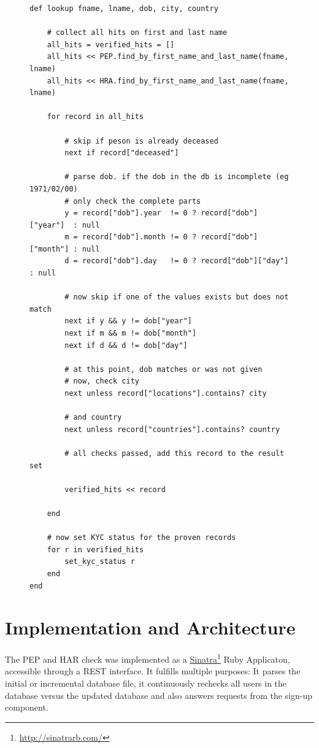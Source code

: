 \documentclass[a4paper, oneside]{csthesis}
\newcommand\fnurl[2]{%
  \href{#2}{#1}\footnote{\url{#2}}%
}
\begin{document}
\begin{figure}
\begin{lstlisting}[caption={The PEP/HRA Lookup algorithm},label={lst:world-check-lookup}]
def lookup fname, lname, dob, city, country

    # collect all hits on first and last name
    all_hits = verified_hits = []
    all_hits << PEP.find_by_first_name_and_last_name(fname, lname)
    all_hits << HRA.find_by_first_name_and_last_name(fname, lname)

    for record in all_hits

        # skip if peson is already deceased
        next if record["deceased"]

        # parse dob. if the dob in the db is incomplete (eg 1971/02/00)
        # only check the complete parts
        y = record["dob"].year  != 0 ? record["dob"]["year"]  : null
        m = record["dob"].month != 0 ? record["dob"]["month"] : null
        d = record["dob"].day   != 0 ? record["dob"]["day"]   : null

        # now skip if one of the values exists but does not match
        next if y && y != dob["year"]
        next if m && m != dob["month"]
        next if d && d != dob["day"]

        # at this point, dob matches or was not given
        # now, check city
        next unless record["locations"].contains? city

        # and country
        next unless record["countries"].contains? country

        # all checks passed, add this record to the result set

        verified_hits << record

    end

    # now set KYC status for the proven records
    for r in verified_hits
        set_kyc_status r
    end
end
\end{lstlisting}
\end{figure}

\section{Implementation and Architecture}

The PEP and HAR check was implemented as a \fnurl{Sinatra}{http://sinatrarb.com/} Ruby Applicaton, accessible through a REST interface. It fulfills multiple purposes: It parses the initial or incremental database file, it continuously rechecks all users in the database versus the updated database and also answers requests from the sign-up component.
\end{document}
